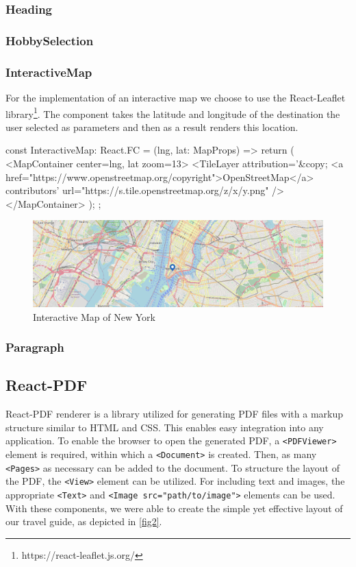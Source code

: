 \documentclass[english,notitlepage,smartquotes]{hgbreport}
\begin{document}
\subsubsection{Heading}

\subsubsection{HobbySelection} \label{HobbySelectionComponent}

\subsubsection{InteractiveMap} \label{InteractiveMap}
For the implementation of an interactive map we choose to use the React-Leaflet library\footnote{https://react-leaflet.js.org/}. The component takes the latitude and longitude of the destination the user selected as parameters and then as a result renders this location.
\begin{PythonCode}
	const InteractiveMap: React.FC = ({lng, lat}: MapProps) => {
		return (
		<MapContainer center={{lng, lat}} zoom={13}>
		<TileLayer
		attribution='&copy; <a href="https://www.openstreetmap.org/copyright">OpenStreetMap</a> contributors'
		url="https://{s}.tile.openstreetmap.org/{z}/{x}/{y}.png"
		/>
		</MapContainer>
		);
	};
\end{PythonCode}
\begin{figure}[H]
	\centering
	\includegraphics[width=1\textwidth]{interactiveMap.png}
	\caption{Interactive Map of New York}
	\label{figInteractiveMap}
\end{figure}

\subsubsection{Paragraph}

\subsection{React-PDF} \label{ReactPDF}

React-PDF renderer is a library utilized for generating PDF files with a markup structure similar to HTML and CSS. This enables easy integration into any application. To enable the browser to open the generated PDF, a \texttt{<PDFViewer>} element is required, within which a \texttt{<Document>} is created. Then, as many \texttt{<Pages>} as necessary can be added to the document. To structure the layout of the PDF, the \texttt{<View>} element can be utilized. For including text and images, the appropriate \texttt{<Text>} and \texttt{<Image src="path/to/image">} elements can be used. With these components, we were able to create the simple yet effective layout of our travel guide, as depicted in \ref{fig2}.
\end{document}
